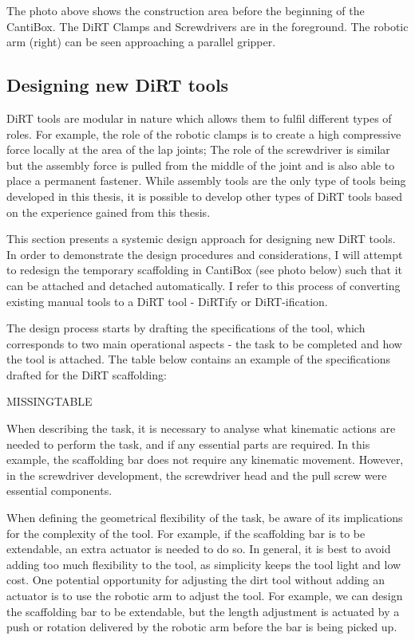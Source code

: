 


The photo above shows the construction area before the beginning of the CantiBox. The DiRT Clamps and Screwdrivers are in the foreground. The robotic arm (right) can be seen approaching a parallel gripper. 

\subsection{Designing new DiRT tools}
\label{subsection:discussion-designing-new-dirt-tools}

DiRT tools are modular in nature which allows them to fulfil different types of roles. For example, the role of the robotic clamps is to create a high compressive force locally at the area of the lap joints; The role of the screwdriver is similar but the assembly force is pulled from the middle of the joint and is also able to place a permanent fastener. While assembly tools are the only type of tools being developed in this thesis, it is possible to develop other types of DiRT tools based on the experience gained from this thesis. 

This section presents a systemic design approach for designing new DiRT tools. In order to demonstrate the design procedures and considerations, I will attempt to redesign the temporary scaffolding in CantiBox (see photo below) such that it can be attached and detached automatically. I refer to this process of converting existing manual tools to a DiRT tool - DiRTify or DiRT-ification.



The design process starts by drafting the specifications of the tool, which corresponds to two main operational aspects - the task to be completed and how the tool is attached. The table below contains an example of the specifications drafted for the DiRT scaffolding:

MISSINGTABLE

When describing the task, it is necessary to analyse what kinematic actions are needed to perform the task, and if any essential parts are required. In this example, the scaffolding bar does not require any kinematic movement. However, in the screwdriver development, the screwdriver head and the pull screw were essential components.

When defining the geometrical flexibility of the task, be aware of its implications for the complexity of the tool. For example, if the scaffolding bar is to be extendable, an extra actuator is needed to do so. In general, it is best to avoid adding too much flexibility to the tool, as simplicity keeps the tool light and low cost. One potential opportunity for adjusting the dirt tool without adding an actuator is to use the robotic arm to adjust the tool. For example, we can design the scaffolding bar to be extendable, but the length adjustment is actuated by a push or rotation delivered by the robotic arm before the bar is being picked up.

